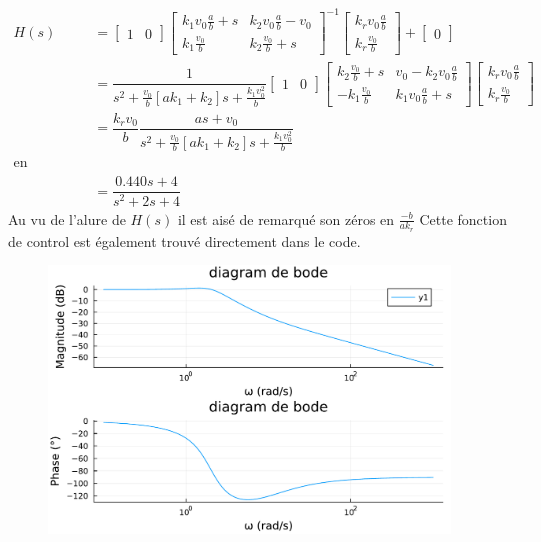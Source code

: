 \documentclass[11pt,a4paper]{article}
\begin{document}
\begin{align*}
	H(s) & = \begin{bmatrix} 1 & 0  \end{bmatrix} \begin{bmatrix}  k_1 v_0  \frac ab +s & k_2v_0  \frac ab - v_0 \\ k_1 \frac {v_0} b & k_2 \frac{v_0}b+s \end{bmatrix}^{-1}
	\begin{bmatrix} k_r v_0 \frac ab \\  k_r \frac{v_0}b \end{bmatrix} + \begin{bmatrix}  0  \end{bmatrix}                                                                                                                         \\
	     & =\dfrac{1}{s^2 + \frac{v_0}b [a k_1 + k_2]s + \frac{k_1 v_0 ^2}b} \begin{bmatrix} 1 & 0 \end{bmatrix} \begin{bmatrix}k_2 \frac{v_0}b+s & v_0 -k_2 v_0 \frac ab \\ - k_1 \frac{v_0}b & k_1 v_0 \frac ab +s \end{bmatrix}
	\begin{bmatrix} k_r v_0 \frac ab \\ k_r \frac {v_0}b \end{bmatrix}                                                                                                                                                             \\
	     & =\dfrac{k_r v_0}{b}\dfrac{as+v_0}{s^2 + \frac{v_0}b [a k_1 + k_2 ]s + \frac{k_1 v_0 ^2}b}                                                                                                                                \\
	\text{en remplacant par les valeurs on obtient;}                                                                                                                                                                               \\
	     & = \dfrac{0.440s + 4}{s^2 + 2 s + 4}
\end{align*}
Au vu de l'alure de $H(s)$ il est aisé de remarqué son zéros en $\frac{-b}{a k_r}$
Cette fonction de control est également trouvé directement dans le code.

\begin{figure}[!h]
  \begin{center}
    \includegraphics[width=0.95\textwidth]{../code/jlplots/Q3.pdf}
  \end{center}
  \caption{}\label{fig:bode}
\end{figure}
\end{document}
